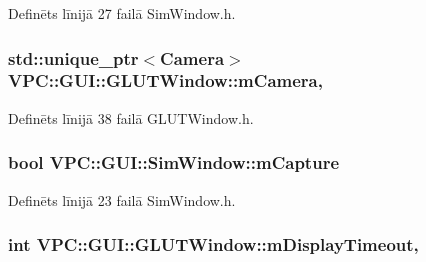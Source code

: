 Definēts līnijā 27 failā Sim\+Window.\+h.

\subsubsection[{\texorpdfstring{m\+Camera}{mCamera}}]{\setlength{\rightskip}{0pt plus 5cm}std\+::unique\+\_\+ptr$<${\bf Camera}$>$ V\+P\+C\+::\+G\+U\+I\+::\+G\+L\+U\+T\+Window\+::m\+Camera\hspace{0.3cm}{\ttfamily [protected]}, {\ttfamily [inherited]}}\hypertarget{class_v_p_c_1_1_g_u_i_1_1_g_l_u_t_window_a188317ab66f82a4c1752797c8f77cc30}{}\label{class_v_p_c_1_1_g_u_i_1_1_g_l_u_t_window_a188317ab66f82a4c1752797c8f77cc30}


Definēts līnijā 38 failā G\+L\+U\+T\+Window.\+h.

\subsubsection[{\texorpdfstring{m\+Capture}{mCapture}}]{\setlength{\rightskip}{0pt plus 5cm}bool V\+P\+C\+::\+G\+U\+I\+::\+Sim\+Window\+::m\+Capture}\hypertarget{class_v_p_c_1_1_g_u_i_1_1_sim_window_aba16bb9ad6a9ad532b1c5e5e0951953d}{}\label{class_v_p_c_1_1_g_u_i_1_1_sim_window_aba16bb9ad6a9ad532b1c5e5e0951953d}


Definēts līnijā 23 failā Sim\+Window.\+h.

\subsubsection[{\texorpdfstring{m\+Display\+Timeout}{mDisplayTimeout}}]{\setlength{\rightskip}{0pt plus 5cm}int V\+P\+C\+::\+G\+U\+I\+::\+G\+L\+U\+T\+Window\+::m\+Display\+Timeout\hspace{0.3cm}{\ttfamily [protected]}, {\ttfamily [inherited]}}\hypertarget{class_v_p_c_1_1_g_u_i_1_1_g_l_u_t_window_a1a0397ed6b305040c02660e4154d3282}{}\label{class_v_p_c_1_1_g_u_i_1_1_g_l_u_t_window_a1a0397ed6b305040c02660e4154d3282}


